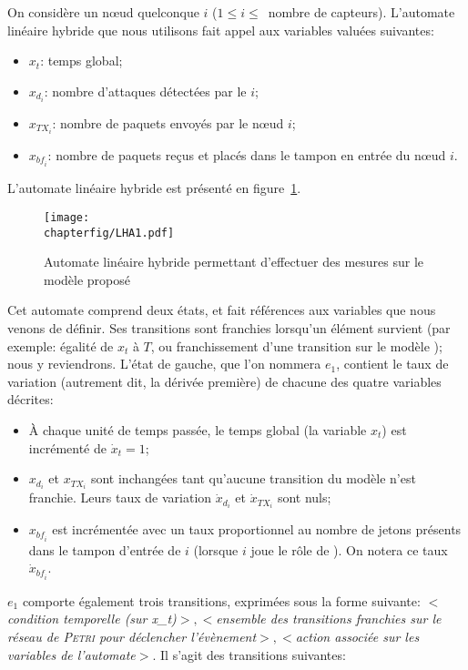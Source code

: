 On considère un nœud quelconque $i$ ($1\leq i\leq$~nombre de capteurs).
L'automate linéaire hybride que nous utilisons fait appel aux variables valuées suivantes:
\begin{itemize}
    \item $x_t$: temps global;
    \item $x_{d_i}$: nombre d'attaques détectées par le \cn $i$;
    \item $x_{\mathit{TX}_i}$: nombre de paquets envoyés par le nœud $i$;
    \item $x_{\mathit{bf}_i}$: nombre de paquets reçus et placés dans le tampon en entrée du nœud $i$.
\end{itemize}
L'automate linéaire hybride est présenté en figure~\ref{sa:fig:lha}.
\begin{figure}[H]
    \centering
    \texttt{[image: \\chapterfig/LHA1.pdf]}
    \caption{Automate linéaire hybride permettant d'effectuer des mesures sur le modèle \rpsge proposé}\label{sa:fig:lha}
\end{figure}
Cet automate comprend deux états, et fait références aux variables que nous venons de définir.
Ses transitions sont franchies lorsqu'un élément survient (par exemple: égalité de $x_t$ à $T$, ou franchissement d'une transition sur le modèle \rpsge); nous y reviendrons.
L'état de gauche, que l'on nommera $e_1$, contient le taux de variation (autrement dit, la dérivée première) de chacune des quatre variables décrites:
\begin{itemize}
    \item À chaque unité de temps passée, le temps global (la variable $x_t$) est incrémenté de $\dot{x}_t=1$;
    \item $x_{d_i}$ et $x_{\mathit{TX}_i}$ sont inchangées tant qu'aucune transition du modèle \rpsge n'est franchie.
        Leurs taux de variation $\dot{x}_{d_i}$ et $\dot{x}_{\mathit{TX}_i}$ sont nuls;
    \item $x_{\mathit{bf}_i}$ est incrémentée avec un taux proportionnel au nombre de jetons présents dans le tampon d'entrée de $i$ (lorsque $i$ joue le rôle de \cn).
        On notera ce taux $\dot{x}_{\mathit{bf}_i}$.
\end{itemize}
$e_1$ comporte également trois transitions, exprimées sous la forme suivante: $<$\textit{condition temporelle (sur x\_t)}$>, <$\textit{ensemble des transitions franchies sur le réseau de \textsc{Petri} pour déclencher l'évènement}$>, <$\textit{action associée sur les variables de l'automate}$>$.
Il s'agit des transitions suivantes:
